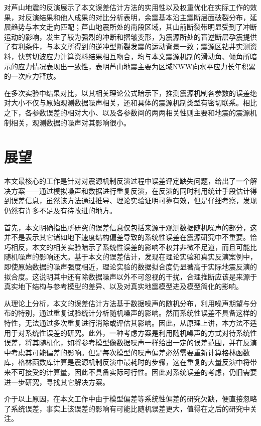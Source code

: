 对芦山地震的反演展示了本文误差估计方法的实用性以及权重优化在实际工作的效果，对反演结果和他人成果的对比分析表明，余震基本沿主震断层面破裂分布，延展趋势与本文走向匹配；芦山地震所处的南段区域，其山前断裂带明显受到了冲断运动的影响，发生了较为强烈的冲断和摺皱变形，为震源所处的盲逆断层孕震提供了有利条件，与本文所得到的逆冲型断裂发震的运动背景一致；震源区钻井实测资料，快剪切波应力计算资料结果相互吻合，均与本文震源机制的滑动角、倾角所暗示的应力情况表现出一致性，表明芦山地震主要为区域NWW向水平应力长年积累的一次应力释放。

在多次实验中结果对比，以其相关理论公式暗示下，推测震源机制各参数的误差绝对大小不仅与原始观测数据噪声相关，还和具体的震源机制类型有密切联系。相比之下，各参数误差的相对大小、以及各参数间的两两相关性则主要和地震的震源机制相关，观测数据的噪声对其影响很小。

\section{展望}
本文最核心的工作是针对对震源机制反演过程中误差评定缺失问题，给出了一个解决方案——通过模拟噪声和数据进行重复反演，在反演的同时利用统计手段估计得到误差信息，虽然该方法通过推导、理论实验证明可靠有效，但是仔细考察，发现仍然有许多不足及有待改进的地方。

首先，本文明确指出所研究的误差信息仅包括来源于观测数据随机噪声的部分，这并不是表示其它诸如地下速度结构偏差导致的系统性误差在震源研究中不重要。恰巧相反，本文的相关实验暗示了系统性误差的影响不权并非微不足道，而且可能比随机噪声的影响还大。基于本文的误差估计，发现在理论实验和真实反演案例中，即使原始数据的噪声强度相近，理论实验的数据拟合度仍显著高于实际地震反演的拟合度。这说明其中还有除数据噪声以外不可忽视的干扰，合理推断应该是来源于真实地下结构与参考模型的差异、以及对真实地震模型进及模型简化的影响。

从理论上分析，本文的误差估计方法基于数据噪声的随机分布，利用噪声期望与分布的特别，通过重复试验统计分析随机噪声的影响。然而系统性误差不具备这样的特性，无法通过多次重复进行消除或评估其影响。因此，从原理上讲，本方法不适用于对系统性误差的研究。此外，一种考虑方案是利用随机噪声的方式对待系统性误差，将其随机化，如将参考模型像数据噪声一样给出一定的误差范围，并在反演中考虑其可能偏差的影响。但是每次模型的噪声偏差必然需要重新计算格林函数库，格林函数库计算是震源机制反演中最耗时的步骤，这在重复的大量反演中将带来不可接受的计算量，因此不具备实际可行性。因此对系统误差的考虑，仍旧需要进一步研究，寻找其它解决方案。

介于以上原因，在本文工作中由于模型偏差等系统性偏差的研究欠缺，便直接忽略了系统误差，事实上该误差的影响有可能比随机误差更大，值得在之后的研究中关注。

